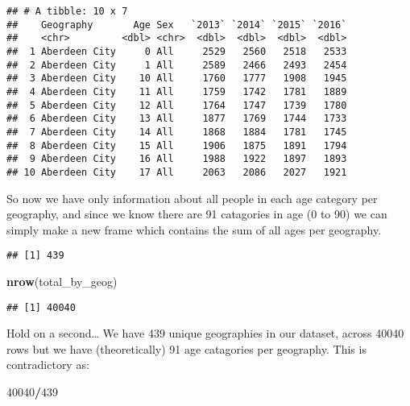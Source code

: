 \documentclass[]{article}
\newenvironment{Shaded}{\begin{snugshade}}{\end{snugshade}}
\newcommand{\KeywordTok}[1]{\textcolor[rgb]{0.13,0.29,0.53}{\textbf{#1}}}
\newcommand{\DecValTok}[1]{\textcolor[rgb]{0.00,0.00,0.81}{#1}}
\newcommand{\StringTok}[1]{\textcolor[rgb]{0.31,0.60,0.02}{#1}}
\newcommand{\OperatorTok}[1]{\textcolor[rgb]{0.81,0.36,0.00}{\textbf{#1}}}
\newcommand{\NormalTok}[1]{#1}
\begin{document}
\begin{verbatim}
## # A tibble: 10 x 7
##    Geography       Age Sex   `2013` `2014` `2015` `2016`
##    <chr>         <dbl> <chr>  <dbl>  <dbl>  <dbl>  <dbl>
##  1 Aberdeen City     0 All     2529   2560   2518   2533
##  2 Aberdeen City     1 All     2589   2466   2493   2454
##  3 Aberdeen City    10 All     1760   1777   1908   1945
##  4 Aberdeen City    11 All     1759   1742   1781   1889
##  5 Aberdeen City    12 All     1764   1747   1739   1780
##  6 Aberdeen City    13 All     1877   1769   1744   1733
##  7 Aberdeen City    14 All     1868   1884   1781   1745
##  8 Aberdeen City    15 All     1906   1875   1891   1794
##  9 Aberdeen City    16 All     1988   1922   1897   1893
## 10 Aberdeen City    17 All     2063   2086   2027   1921
\end{verbatim}

So now we have only information about all people in each age category
per geography, and since we know there are 91 catagories in age (0 to
90) we can simply make a new frame which contains the sum of all ages
per geography.

\begin{Shaded}
\end{Shaded}

\begin{verbatim}
## [1] 439
\end{verbatim}

\begin{Shaded}
\begin{Highlighting}[]
\KeywordTok{nrow}\NormalTok{(total_by_geog)}
\end{Highlighting}
\end{Shaded}

\begin{verbatim}
## [1] 40040
\end{verbatim}

Hold on a second\ldots{} We have 439 unique geographies in our dataset,
across 40040 rows but we have (theoretically) 91 age catagories per
geography. This is contradictory as:

\begin{Shaded}
\begin{Highlighting}[]
\DecValTok{40040}\OperatorTok{/}\DecValTok{439}
\end{Highlighting}
\end{Shaded}
\end{document}
